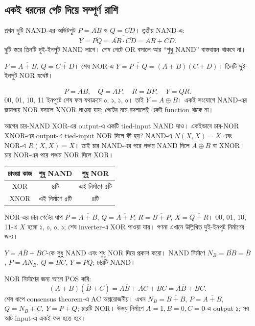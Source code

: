 \subsection{একই ধরনের গেট দিয়ে সম্পূর্ণ রাশি}
\chThreeAnswer প্রথম দুটি NAND-এর আউটপুট $P=\overline{AB}$ ও $Q=\overline{CD}$। তৃতীয় NAND-এ:
\[Y=\overline{PQ}=\overline{\overline{AB}\cdot\overline{CD}}=AB+CD.\]
দুটি স্তরে তিনটি দুই-ইনপুট NAND লাগে। শেষ গেটে OR বসালে আর ``শুধু NAND'' বাস্তবায়ন থাকবে না।

\chThreeAnswer $P=\overline{A+B}$, $Q=\overline{C+D}$। শেষ NOR-এ $Y=\overline{P+Q}=(A+B)(C+D)$। তিনটি দুই-ইনপুট NOR যথেষ্ট।

\chThreeAnswer
\[P=\overline{AB},\quad Q=\overline{AP},\quad R=\overline{BP},\quad Y=\overline{QR}.\]
00, 01, 10, 11 ইনপুটে শেষ ফল যথাক্রমে ০, ১, ১, ০। তাই $Y=A\oplus B$। একই সংযোগে NAND-এর জায়গায় NOR বসালে XNOR পাওয়া যায়; গেটের নাম বদলালেই একই function থাকে না।

আগের চার-NAND XOR-এর output-এ একটি tied-input NAND দাও। একইভাবে চার-NOR XNOR-এর output-এ tied-input NOR দিলে কী হয়?
\chThreeAnswer NAND-এ $N(X,X)=\overline X$ এবং NOR-এ $R(X,X)=\overline X$। তাই চার NAND-এর পরে পঞ্চম NAND দিলে $\overline{A\oplus B}$ বা XNOR। চার NOR-এর পরে পঞ্চম NOR দিলে XOR।
\begin{center}\begin{tabular}{|c|c|c|}\hline
চাওয়া কাজ & শুধু NAND & শুধু NOR\\\hline
XOR & ৪টি & এই নির্মাণে ৫টি\\\hline
XNOR & এই নির্মাণে ৫টি & ৪টি\\\hline
\end{tabular}\end{center}
NOR-এর চার গেটের ধাপ $P=\overline{A+B}$, $Q=\overline{A+P}$, $R=\overline{B+P}$, $X=\overline{Q+R}$। 00, 01, 10, 11-এ $X$ হলো ১, ০, ০, ১; শেষ inverter-এ XOR পাওয়া যায়। গণনা এখানে উল্লিখিত দুই-ইনপুট নির্মাণের জন্য।

$Y=A\overline B+BC$-কে শুধু NAND এবং শুধু NOR দিয়ে প্রকাশ করো।
\chThreeAnswer NAND নির্মাণে $N_B=\overline{BB}=\overline B$, $P=\overline{AN_B}$, $Q=\overline{BC}$, $Y=\overline{PQ}$; চারটি NAND।

NOR নির্মাণের জন্য আগে POS করি:
\[(A+B)(\overline B+C)=A\overline B+AC+BC=A\overline B+BC.\]
শেষ ধাপে consensus theorem-এ AC অপ্রয়োজনীয়। এখন $N_B=\overline{B+B}$, $P=\overline{A+B}$, $Q=\overline{N_B+C}$, $Y=\overline{P+Q}$; চারটি NOR। উভয় নির্মাণে $A=1,B=0,C=0$-এ output ১; সব আট input-এ একই ফল হতে হবে।

